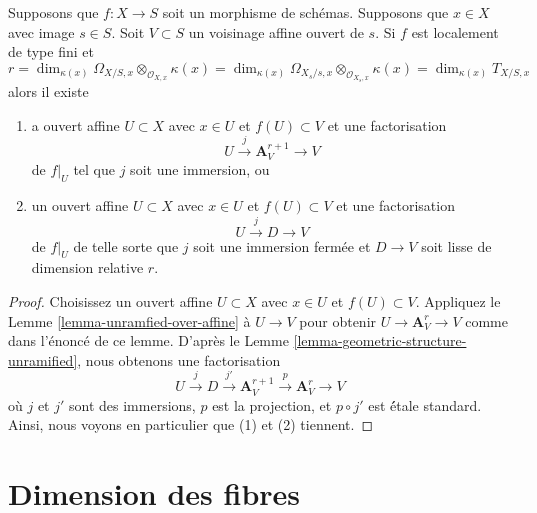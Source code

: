 \begin{lemma}
\label{lemma-immersion-into-affine}
Supposons que $f : X \to S$ soit un morphisme de
schémas. Supposons que $x \in X$ avec image $s
\in S$. Soit $V \subset S$ un voisinage affine
ouvert de $s$. Si $f$ est localement de type fini et
$$
r =
\dim_{\kappa(x)} \Omega_{X/S, x} \otimes_{\mathcal{O}_{X, x}} \kappa(x) =
\dim_{\kappa(x)} \Omega_{X_s/s, x} \otimes_{\mathcal{O}_{X_s, x}} \kappa(x) =
\dim_{\kappa(x)} T_{X/S, x}
$$
alors il existe
\begin{enumerate}
\item a ouvert affine $U \subset X$ avec $x
\in U$ et $f(U) \subset V$ et une factorisation
$$
U \xrightarrow{j} \mathbf{A}^{r + 1}_V \to V
$$
de $f|_U$ tel que $j$ soit une immersion, ou
\item un ouvert affine $U \subset X$ avec $x
\in U$ et $f(U) \subset V$ et une factorisation
$$
U \xrightarrow{j} D \to V
$$
de $f|_U$ de telle sorte que $j$ soit une immersion
fermée et $D \to V$ soit lisse de dimension relative $r$.
\end{enumerate}
\end{lemma}

\begin{proof}
Choisissez un ouvert affine $U \subset X$ avec $x \in U$ et
$f(U) \subset V$. Appliquez le Lemme
\ref{lemma-unramfied-over-affine} à $U \to V$ pour obtenir $U \to
\mathbf{A}^r_V \to V$ comme dans l'énoncé de ce lemme. D'après le Lemme
\ref{lemma-geometric-structure-unramified}, nous obtenons une factorisation
$$
U \xrightarrow{j} D \xrightarrow{j'} \mathbf{A}^{r + 1}_V
\xrightarrow{p} \mathbf{A}^r_V \to V
$$
où $j$ et $j'$ sont des immersions, $p$ est la
projection, et $p \circ j'$ est \' étale standard.
Ainsi, nous voyons en particulier que (1) et (2) tiennent.
\end{proof}





\section{Dimension des fibres}
\label{section-dimension-fibres}

